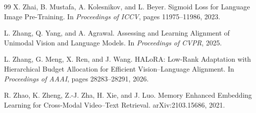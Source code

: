 \begin{thebibliography}{99}
X. Zhai, B. Mustafa, A. Kolesnikov, and L. Beyer.
\newblock Sigmoid Loss for Language Image Pre-Training.
\newblock In \emph{Proceedings of ICCV}, pages 11975--11986, 2023.

L. Zhang, Q. Yang, and A. Agrawal.
\newblock Assessing and Learning Alignment of Unimodal Vision and Language Models.
\newblock In \emph{Proceedings of CVPR}, 2025.

L. Zhang, G. Meng, X. Ren, and J. Wang.
\newblock HALoRA: Low-Rank Adaptation with Hierarchical Budget Allocation for
Efficient Vision--Language Alignment.
\newblock In \emph{Proceedings of AAAI}, pages 28283--28291, 2026.

R. Zhao, K. Zheng, Z.-J. Zha, H. Xie, and J. Luo.
\newblock Memory Enhanced Embedding Learning for Cross-Modal Video--Text Retrieval.
\newblock arXiv:2103.15686, 2021.

\end{thebibliography}